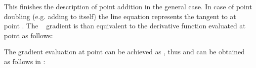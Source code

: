 
This finishes the description of point addition in the general case. In case of point doubling (e.g. adding  to itself) the line equation \mathFormulaEllipticCurveLineEquation represents the tangent to  at point . The \mathFormulaEllipticCurveGradientOfLine~ gradient is than equivalent to the derivative function  evaluated at point  as follows:


The gradient evaluation at point  can be achieved as  , thus  and  can be obtained as follows in  : 



